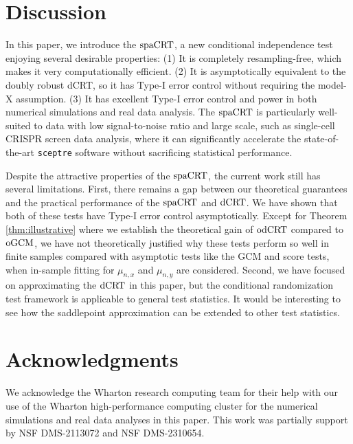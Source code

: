 \documentclass[12pt]{article}
\theoremstyle{definition}
\newcommand{\dCRT}{\textnormal{dCRT}} 					%
\newcommand{\odCRT}{\textnormal{odCRT}} 					%
\newcommand{\oGCM}{\textnormal{oGCM}}						%
\newcommand{\spacrt}{\textnormal{spaCRT}}               %
\begin{document}


\section{Discussion} \label{sec:discussion}

In this paper, we introduce the $\spacrt$, a new conditional independence test enjoying several desirable properties: (1) It is completely resampling-free, which makes it very computationally efficient. (2) It is asymptotically equivalent to the doubly robust dCRT, so it has Type-I error control without requiring the model-X assumption. (3) It has excellent Type-I error control and power in both numerical simulations and real data analysis. The $\spacrt$ is particularly well-suited to data with low signal-to-noise ratio and large scale, such as single-cell CRISPR screen data analysis, where it can significantly accelerate the state-of-the-art \verb|sceptre| software without sacrificing statistical performance.

Despite the attractive properties of the $\spacrt$, the current work still has several limitations. First, there remains a gap between our theoretical guarantees and the practical performance of the $\spacrt$ and $\dCRT$. We have shown that both of these tests have Type-I error control asymptotically. Except for Theorem \ref{thm:illustrative} where we establish the theoretical gain of $\odCRT$ compared to $\oGCM$, we have not theoretically justified why these tests perform so well in finite samples compared with asymptotic tests like the GCM and score tests, when in-sample fitting for $\mu_{n,x}$ and $\mu_{n,y}$ are considered. Second, we have focused on approximating the $\dCRT$ in this paper, but the conditional randomization test framework is applicable to general test statistics. It would be interesting to see how the saddlepoint approximation can be extended to other test statistics.

\section{Acknowledgments}

We acknowledge the Wharton research computing team for their help with our use of the Wharton high-performance computing cluster for the numerical simulations and real data analyses in this paper. This work was partially support by NSF DMS-2113072 and NSF DMS-2310654.
\end{document}
